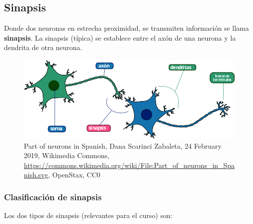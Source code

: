 \subsection{Sinapsis}

 Donde dos neuronas en estrecha proximidad, se transmiten información se llama \textbf{sinapsis}. La sinapsis (típica) se establece entre el axón de una neurona y la dendrita de otra neurona. \parencite{sistemaNervioso}%



\begin{figure}[h]
 \centering
 \includegraphics[scale=0.5]{../Figuras/Part_of_neurons_in_Spanish.png}
 \caption{Part of neurons in Spanish, Dana Scarinci Zabaleta, 24 February 2019, Wikimedia Commons, \url{https://commons.wikimedia.org/wiki/File:Part_of_neurons_in_Spanish.svg}, OpenStax, CC0}
 \label{fig:sinapsisN}
\end{figure}


\subsubsection{Clasificación de sinapsis}

Los dos tipos de sinapsis (relevantes para el curso) son:

